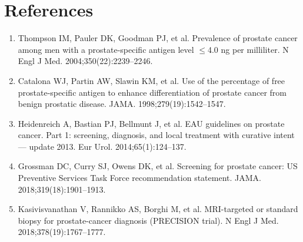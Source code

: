\section*{References}
\begin{enumerate}
  \item Thompson IM, Pauler DK, Goodman PJ, et al. Prevalence of prostate cancer among men with a prostate-specific antigen level $\leq$4.0 ng per milliliter. N Engl J Med. 2004;350(22):2239--2246.
  \item Catalona WJ, Partin AW, Slawin KM, et al. Use of the percentage of free prostate-specific antigen to enhance differentiation of prostate cancer from benign prostatic disease. JAMA. 1998;279(19):1542--1547.
  \item Heidenreich A, Bastian PJ, Bellmunt J, et al. EAU guidelines on prostate cancer. Part 1: screening, diagnosis, and local treatment with curative intent --- update 2013. Eur Urol. 2014;65(1):124--137.
  \item Grossman DC, Curry SJ, Owens DK, et al. Screening for prostate cancer: US Preventive Services Task Force recommendation statement. JAMA. 2018;319(18):1901--1913.
  \item Kasivisvanathan V, Rannikko AS, Borghi M, et al. MRI-targeted or standard biopsy for prostate-cancer diagnosis (PRECISION trial). N Engl J Med. 2018;378(19):1767--1777.
\end{enumerate}

\clearpage
